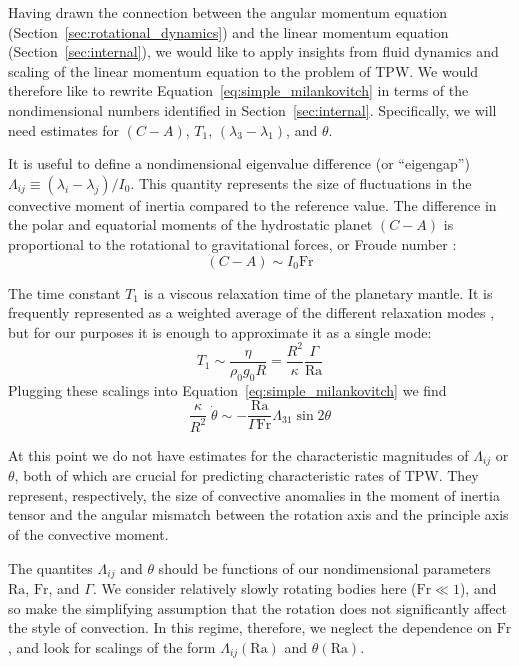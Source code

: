 \documentclass[extra,mreferee]{gji}
\begin{document}
Having drawn the connection between the angular momentum equation (Section~\ref{sec:rotational_dynamics}) and the linear momentum 
equation (Section~\ref{sec:internal}), we would like to apply insights from fluid dynamics and scaling of the 
linear momentum equation to the problem of TPW. We would therefore like to rewrite Equation~\eqref{eq:simple_milankovitch}
in terms of the nondimensional numbers identified in Section~\ref{sec:internal}.
Specifically, we will need estimates for $(C-A)$, $T_1$, $(\lambda_3-\lambda_1)$, and $\theta$. 

It is useful to define a nondimensional eigenvalue difference (or ``eigengap'') $\Lambda_{ij} \equiv (\lambda_i - \lambda_j)/I_0$.  
This quantity represents the size of fluctuations in the convective moment of inertia compared to the reference value.
The difference in the polar and equatorial moments of the hydrostatic planet $(C-A)$ is proportional to the rotational to gravitational forces, or Froude number \citep{munk1960rotation}:
\begin{equation}
(C-A) \sim I_0 \mathrm{Fr}
\end{equation}

The time constant $T_1$ is a viscous relaxation time of the planetary mantle. It is frequently represented as a weighted average of the different relaxation modes \citep[e.g.][]{ricard1993polar, greff2004upwelling}, but for our purposes it is enough to approximate it as a single mode:
\begin{equation}
T_1 \sim \frac{ \eta }{ \rho_0 g_0 R} = \frac{R^2}{\kappa} \frac{\Gamma}{\mathrm{Ra} }
\end{equation}
Plugging these scalings into Equation~\eqref{eq:simple_milankovitch} we find
\begin{equation}
\frac{\kappa}{R^2} \; \dot{\theta} \sim - \frac{\mathrm{Ra}}{\Gamma \mathrm{Fr}} \Lambda_{31} \sin{2 \theta}
\label{eq:scaled_rotation}
\end{equation}

At this point we do not have estimates for the characteristic magnitudes of $\Lambda_{ij}$ or $\theta$, both of which are crucial for predicting characteristic rates of TPW.
They represent, respectively, the size of convective anomalies in the moment of inertia tensor and the angular mismatch between the rotation axis and the principle axis of the convective moment.


The quantites $\Lambda_{ij}$ and $\theta$ should be functions of our nondimensional parameters $\mathrm{Ra}$, $\mathrm{Fr}$, and $\Gamma$.  
We consider relatively slowly rotating bodies here ($\mathrm{Fr} \ll 1$), and so make the simplifying assumption that the rotation does not significantly affect the style of convection.  
In this regime, therefore, we neglect the dependence on $\mathrm{Fr}$, and look for scalings of the form $\Lambda_{ij}(\mathrm{Ra})$ and $\theta(\mathrm{Ra})$.
\end{document}
